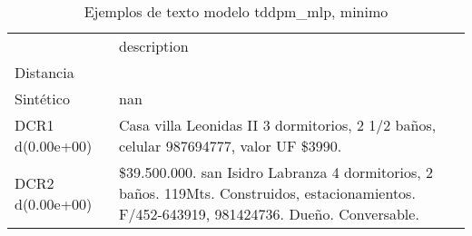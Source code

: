 \begin{table}[H]
\centering
\fontsize{10}{14}\selectfont
\caption{Ejemplos de texto modelo tddpm\_mlp, minimo}
\label{table-example-economicos-b-2-tddpm_mlp-min-text}
\begin{tabular}{|l|m{35em}|}
\hline
\rowcolor[gray]{0.8}
 & description \\
Distancia &  \\
\hline Sintético & nan \\
\hline DCR1 d(0.00e+00) & Casa villa Leonidas II 3 dormitorios, 2 1/2 ba\~nos, celular 987694777, valor UF \$3990. \\
\hline DCR2 d(0.00e+00) & \$39.500.000. san Isidro Labranza 4 dormitorios, 2 ba\~nos. 119Mts. Construidos, estacionamientos. F/452-643919, 981424736. Due\~no. Conversable. \\
\hline
\end{tabular}
\end{table}
